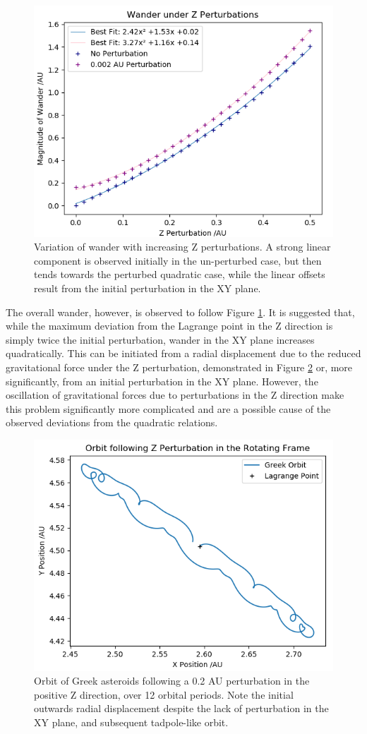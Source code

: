 \documentclass[11pt, a4paper,twocolumn]{article} %
\begin{document}
\begin{figure}[ht]
	\centering
	\includegraphics[width=0.8\linewidth]{Figures/z_perturbations5c}
	\caption{Variation of wander with increasing Z perturbations. A strong linear component is observed initially in the un-perturbed case, but then tends towards the perturbed quadratic case, while the linear offsets result from the initial perturbation in the XY plane.}
	\label{fig:zwander}
\end{figure}

The overall wander, however, is observed to follow Figure \ref{fig:zwander}.
It is suggested that, while the maximum deviation from the Lagrange point in the Z direction is simply twice the initial perturbation, wander in the XY plane increases quadratically. This can be initiated from a radial displacement due to the reduced gravitational force  under the Z perturbation, demonstrated in Figure \ref{fig:zorbit} or, more significantly, from an initial perturbation in the XY plane. However, the oscillation of gravitational forces due to perturbations in the Z direction make this problem significantly more complicated and are a possible cause of the observed deviations from the quadratic relations.

\begin{figure}[ht]
	\centering
	\includegraphics[width=0.8\linewidth]{Figures/z_perturb_orbit}
	\caption{Orbit of Greek asteroids following a 0.2 AU perturbation in the positive Z direction, over 12 orbital periods. Note the initial outwards radial displacement despite the lack of perturbation in the XY plane, and subsequent tadpole-like orbit.}
	\label{fig:zorbit}
\end{figure}
\end{document}
